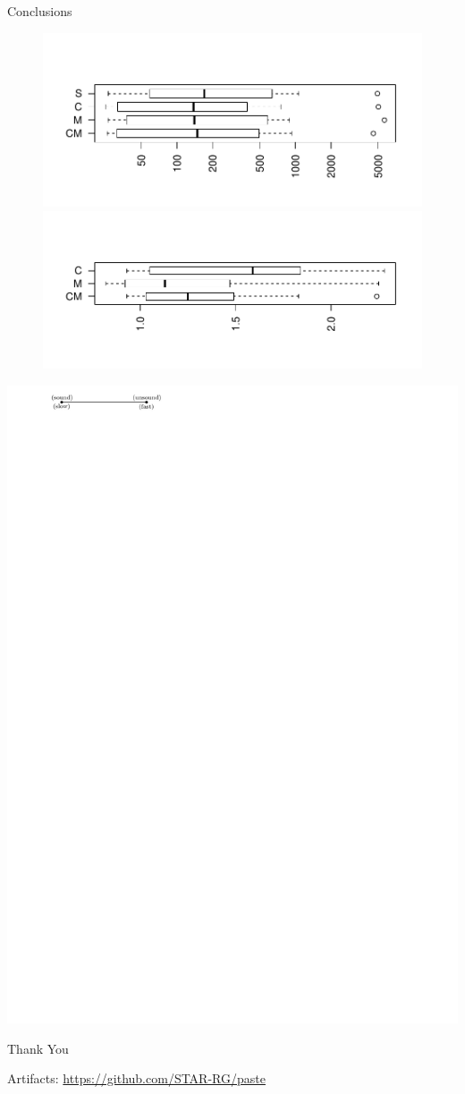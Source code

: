 \documentclass{beamer}
\begin{document}
\begin{frame}{Conclusions}
\begin{center}
\begin{figure}[!htb]
			\pause
			\begin{minipage}{0.5\textwidth}
				\centering
				\includegraphics[width=1.175\linewidth]{images/time.pdf}\vspace{-1cm}
				\includegraphics[width=1.175\linewidth]{images/speedup.pdf}	
			\end{minipage}
		\end{figure}
		\includegraphics[width=0.5\linewidth,page=2]{images/spectrum.pdf}
		\pause
		\hfill
		\begin{Large}
			Thank You
		\end{Large}
		\vfill
		\begin{footnotesize}
			Artifacts: \url{https://github.com/STAR-RG/paste}
		\end{footnotesize}
	\end{center}
\end{frame}
\end{document}
